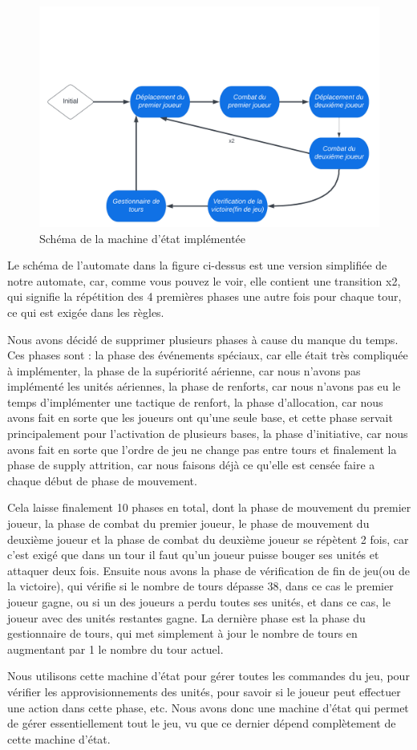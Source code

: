 \begin{figure}[H]
    \centering
    \includegraphics[scale=0.2]{data/State_Machine.png}
    \caption{Schéma de la machine d'état implémentée}
    \label{fig:schema_state_machine}
\end{figure}

Le schéma de l'automate dans la figure ci-dessus est une version simplifiée de notre automate, car, comme vous pouvez le voir, elle contient une transition x2, qui signifie la répétition des 4 premières phases une autre fois pour chaque tour, ce qui est exigée dans les règles.

Nous avons décidé de supprimer plusieurs phases à cause du manque du temps. Ces phases sont : la phase des événements spéciaux, car elle était très compliquée à implémenter, la phase de la supériorité aérienne, car nous n'avons pas implémenté les unités aériennes, la phase de renforts, car nous n'avons pas eu le temps d'implémenter une tactique de renfort, la phase d'allocation, car nous avons fait en sorte que les joueurs ont qu'une seule base, et cette phase servait principalement pour l'activation de plusieurs bases, la phase d'initiative, car nous avons fait en sorte que l'ordre de jeu ne change pas entre tours et finalement la phase de supply attrition, car nous faisons déjà ce qu'elle est censée faire a chaque début de phase de mouvement.

Cela laisse finalement 10 phases en total, dont la phase de mouvement du premier joueur, la phase de combat du premier joueur, le phase de mouvement du deuxième joueur et la phase de combat du deuxième joueur se répètent 2 fois, car c'est exigé que dans un tour il faut qu'un joueur puisse bouger ses unités et attaquer deux fois. Ensuite nous avons la phase de vérification de fin de jeu(ou de la victoire), qui vérifie si le nombre de tours dépasse 38, dans ce cas le premier joueur gagne, ou si un des joueurs a perdu toutes ses unités, et dans ce cas, le joueur avec des unités restantes gagne. La dernière phase est la phase du gestionnaire de tours, qui met simplement à jour le nombre de tours en augmentant par 1 le nombre du tour actuel.

Nous utilisons cette machine d'état pour gérer toutes les commandes du jeu, pour vérifier les approvisionnements des unités, pour savoir si le joueur peut effectuer une action dans cette phase, etc. Nous avons donc une machine d'état qui permet de gérer essentiellement tout le jeu, vu que ce dernier dépend complètement de cette machine d'état.